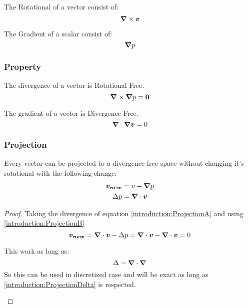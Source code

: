 \begin{definition}
 The Rotational of a vector consist of:
 \begin{equation}
  {\boldsymbol {\nabla}} \times {\boldsymbol {v}}
 \end{equation}
\end{definition}

\begin{definition}
 The Gradient of a scalar consist of:
 \begin{equation}
  {\boldsymbol {\nabla}} p
 \end{equation}
\end{definition}

\subsubsection{Property}

\begin{property}
 The divergence of a vector is Rotational Free.
 \begin{equation}
  {\boldsymbol {\nabla}}\times {\boldsymbol {\nabla}} p={\boldsymbol {0}}
 \end{equation}
\end{property}

\begin{property}
The gradient of a vector is Divergence Free.
 \begin{equation}
  {\boldsymbol {\nabla}}\cdot {\boldsymbol {\nabla}} {\boldsymbol {v}}=0
 \end{equation}
\end{property}
\subsubsection{Projection}

\label{introduction:projection}
\begin{property}
 Every vector can be projected to a divergence free space without changing it's rotational with the following change:
\begin{align}
 {\boldsymbol {v_{new}}}&=v-{\boldsymbol {\nabla}}p \label{introduction:ProjectionA}\\
 \Delta p&={\boldsymbol {\nabla}} \cdot {\boldsymbol {v}} \label{introduction:ProjectionB}
\end{align}
\end{property}
\begin{proof}
  Taking the divergence of equation \ref{introduction:ProjectionA} and using \ref{introduction:ProjectionB}
  \begin{equation}
   {\boldsymbol {v_{new}}}={\boldsymbol {\nabla}}\cdot{\boldsymbol {v}}-\Delta p={\boldsymbol {\nabla}}\cdot{\boldsymbol {v}}-{\boldsymbol {\nabla}}\cdot{\boldsymbol {v}}=0
  \end{equation}
  \begin{remark}
 This work as long as:
 \begin{equation}
  \Delta={\boldsymbol {\nabla}}\cdot {\boldsymbol {\nabla}}\label{introduction:ProjectionDelta}
 \end{equation}
 So this can be used in discretized case and will be exact as long as \ref{introduction:ProjectionDelta} is respected.
 \end{remark}
\end{proof}

